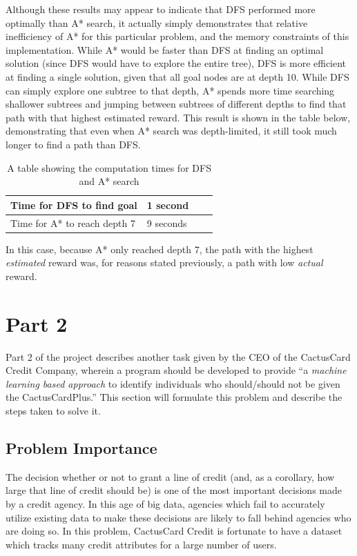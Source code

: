 \documentclass[11pt,journal]{IEEEtran}
\begin{document}
Although these results may appear to indicate that DFS performed more optimally than A* search, it actually simply demonstrates that relative inefficiency of A* for this particular problem, and the memory constraints of this implementation. While A* would be faster than DFS at finding an optimal solution (since DFS would have to explore the entire tree), DFS is more efficient at finding a single solution, given that all goal nodes are at depth 10. While DFS can simply explore one subtree to that depth, A* spends more time searching shallower subtrees and jumping between subtrees of different depths to find that path with that highest estimated reward. This result is shown in the table below, demonstrating that even when A* search was depth-limited, it still took much longer to find a path than DFS.

\begin{table}[H]
\centering
{\renewcommand{\arraystretch}{1.2}%
\begin{tabular}{ | p{2.5cm} | l | l | l | }
\hline
Time for DFS to find goal         & 1 second           \\ \hline
Time for A* to reach depth 7    & 9 seconds             \\ \hline
\end{tabular}} \quad
\caption{A table showing the computation times for DFS and A* search}
\end{table}

In this case, because A* only reached depth 7, the path with the highest \textit{estimated} reward was, for reasons stated previously, a path with low \textit{actual} reward.

\section{Part 2} \label{part2}
Part 2 of the project describes another task given by the CEO of the CactusCard Credit Company, wherein a program should be developed to provide ``a \emph{machine learning based approach} to identify individuals who should/should not be given the CactusCardPlus.'' This section will formulate this problem and describe the steps taken to solve it.

\subsection{Problem Importance}
The decision whether or not to grant a line of credit (and, as a corollary, how large that line of credit should be) is one of the most important decisions made by a credit agency. In this age of big data, agencies which fail to accurately utilize existing data to make these decisions are likely to fall behind agencies who are doing so. In this problem, CactusCard Credit is fortunate to have a dataset which tracks many credit attributes for a large number of users.
\end{document}

